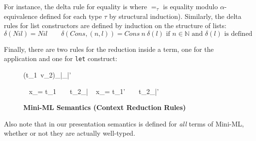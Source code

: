 \documentclass[a4paper,11pt,oneside]{article}
\theoremstyle{plain}
\newcommand{\mem}{_{|\mu}}\newcommand{\memp}{_{|\mu'}}
\begin{document}
	For instance, the delta rule for equality is 
	where $=_\tau$ is equality modulo $\alpha$-equivalence defined for each type $\tau$ by structural induction).
	Similarly, the delta rules for list constructors are defined by induction on the structure of lists: 
	 $$\delta(Nil) = Nil \qquad \delta(Cons, (n, l)) = Cons~n~\delta(l) 
	 \text{    if } n \in \mathbb{N} \text{ and } \delta(l) \text{ is defined } $$

 Finally, there are two rules for the reduction inside a term, one for the application and one for \texttt{let} construct: 
	\begin{figure}[H]
	\begin{small}
	\begin{spacing}{1.2} 	
	\begin{adjustwidth}{-6em}{-6em}
	\begin{minipage}[t]{0.41\linewidth}
	\infrule[E-App-T]	
	{{t_{1}}\mem \rightarrow {{t'}_{1}}\memp}
	{{(t_{1}~v_2)}\mem {}\memp}
	\end{minipage}
	\begin{minipage}[t]{0.45\linewidth}
	\infrule[E-Let-T]
	{{t_{1}}\mem \rightarrow {{t'}_{1}}\memp}
	{ ~ x_\tau = t_{1} ~ ~ {t_{2}}\mem
		\rightarrow 
		 ~ x_\tau = t_{1}' ~ ~ {t_{2}}\memp}
 \end{minipage}
 \end{adjustwidth}
\end{spacing}
\end{small}
\caption{ \textbf{Mini-ML Semantics (Context Reduction Rules)} \hfill}
\label{mini-ml-def-sem}
\end{figure}

Also note that in our presentation semantics is defined for \textit{all} terms of Mini-ML, whether or not they are actually well-typed. 
\end{document}
